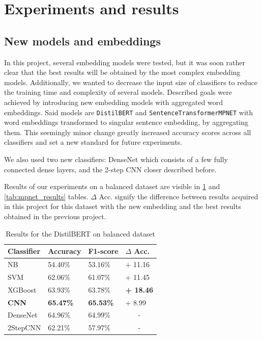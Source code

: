 \section{Experiments and results}\label{experiments}

\subsection{New models and embeddings}
 In this project, several embedding models were tested, but it was soon rather clear that the best results will be obtained by the most complex embedding models. Additionally, we wanted to decrease the input size of classifiers to reduce the training time and complexity of several models. Described goals were achieved by introducing new embedding models with aggregated word embeddings. Said models are \texttt{DistilBERT} and \texttt{SentenceTransformerMPNET} with word embeddings transformed to singular sentence embedding, by aggregating them. This seemingly minor change greatly increased accuracy scores across all classifiers and set a new standard for future experiments.

 We also used two new classifiers: DenseNet which consists of a few fully connected dense layers, and the 2-step CNN closer described before. 
 
 Results of our experiments on a balanced dataset are visible in \ref{tab:distilbert_results} and \ref{tab:mpnet_results} tables. $\Delta$ Acc. signify the difference between results acquired in this project for this dataset with the new embedding and the best results obtained in the previous project.

\begin{table}[!h]
\centering
\begin{tabular}{l|l|l|l}
\textbf{Classifier} & \textbf{Accuracy} & \textbf{F1-score} & \textbf{ $\Delta$ Acc.}  \\ \hline
NB         & 54.40\%           & 53.16\%           & + 11.16               \\
SVM          & 62.06\%           & 61.07\%           & + 11.45               \\
XGBoost             & 63.93\%           & 63.78\%           & \textbf{+ 18.46}      \\
\textbf{CNN}        & \textbf{65.47\%}  & \textbf{65.53\%}  & + 8.99                \\
DenseNet            & 64.96\%           & 64.99\%           & \multicolumn{1}{c}{-} \\
2StepCNN            & 62.21\%           & 57.97\%           & \multicolumn{1}{c}{-}
\end{tabular}
\caption{Results for the DistilBERT  on balanced dataset}
\label{tab:distilbert_results}
\end{table}


